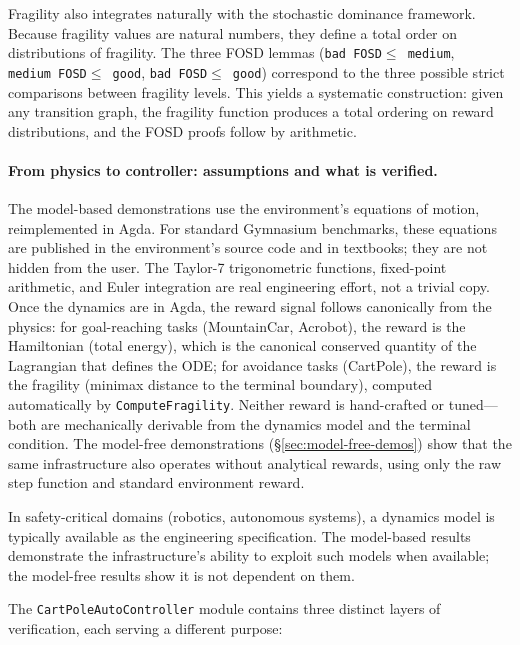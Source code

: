 \documentclass[9pt,a4paper]{article}
\theoremstyle{plain}
\theoremstyle{definition}
\theoremstyle{remark}
\begin{document}
Fragility also integrates naturally with the stochastic dominance framework.  Because fragility values are natural numbers, they define a total order on distributions of fragility.  The three FOSD lemmas (\texttt{bad~FOSD$\le$~medium}, \texttt{medium~FOSD$\le$~good}, \texttt{bad~FOSD$\le$~good}) correspond to the three possible strict comparisons between fragility levels.  This yields a systematic construction: given any transition graph, the fragility function produces a total ordering on reward distributions, and the FOSD proofs follow by arithmetic.

\paragraph{From physics to controller: assumptions and what is verified.}
The model-based demonstrations use the environment's equations of motion, reimplemented in Agda.  For standard Gymnasium benchmarks, these equations are published in the environment's source code and in textbooks; they are not hidden from the user.  The Taylor-7 trigonometric functions, fixed-point arithmetic, and Euler integration are real engineering effort, not a trivial copy.  Once the dynamics are in Agda, the reward signal follows canonically from the physics: for goal-reaching tasks (MountainCar, Acrobot), the reward is the Hamiltonian (total energy), which is the canonical conserved quantity of the Lagrangian that defines the ODE; for avoidance tasks (CartPole), the reward is the fragility (minimax distance to the terminal boundary), computed automatically by \texttt{ComputeFragility}.  Neither reward is hand-crafted or tuned---both are mechanically derivable from the dynamics model and the terminal condition.  The model-free demonstrations (\S\ref{sec:model-free-demos}) show that the same infrastructure also operates without analytical rewards, using only the raw step function and standard environment reward.

In safety-critical domains (robotics, autonomous systems), a dynamics model is typically available as the engineering specification.  The model-based results demonstrate the infrastructure's ability to exploit such models when available; the model-free results show it is not dependent on them.

The \texttt{CartPoleAutoController} module contains three distinct layers of verification, each serving a different purpose:
\end{document}
